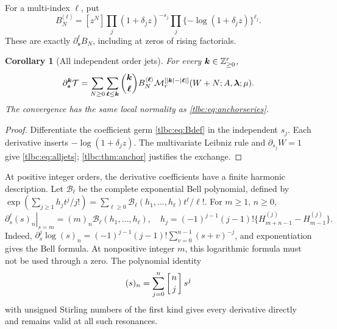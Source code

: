 \documentclass[11pt,letterpaper]{article}
\numberwithin{equation}{section}
\newtheorem{corollary}[theorem]{Corollary}
\theoremstyle{definition}\newtheorem{definition}[theorem]{Definition}
\theoremstyle{remark}\newtheorem{remark}[theorem]{Remark}
\newcommand{\M}{\mathcal M}\newcommand{\T}{\mathcal T}\newcommand{\K}{\mathcal K}
\newcommand{\bs}{\boldsymbol s}\newcommand{\ba}{\boldsymbol a}\newcommand{\bl}{\boldsymbol\lambda}
\begin{document}
For a multi-index $\boldsymbol\ell$, put
\begin{equation}\label{tlbc:eq:Bjet}
 B_N^{\langle\boldsymbol\ell\rangle}
 =[z^N]\prod_j(1+\delta_jz)^{-s_j}
              \prod_j\{-\log(1+\delta_jz)\}^{\ell_j}.
\end{equation}
These are exactly $\partial_{\bs}^{\boldsymbol\ell}B_N$, including at zeros of rising factorials.

\begin{corollary}[All independent order jets]\label{tlbc:cor:independentjets}
For every $\boldsymbol k\in\mathbb Z_{\ge0}^r$,
\begin{equation}\label{tlbc:eq:alljets}
 \partial_{\bs}^{\bk}\T
 =\sum_{N\ge0}\sum_{\boldsymbol\ell\le\bk}
       \binom{\bk}{\boldsymbol\ell}
       B_N^{\langle\boldsymbol\ell\rangle}
       \M_r^{[|\bk|-|\boldsymbol\ell|]}(W+N;A,\bl;\mu).
\end{equation}
The convergence has the same local normality as \eqref{tlbc:eq:anchorseries}.
\end{corollary}
\begin{proof}
Differentiate the coefficient germ \eqref{tlbc:eq:Bdef} in the independent $s_j$. Each derivative inserts $-\log(1+\delta_jz)$. The multivariate Leibniz rule and $\partial_{s_j}W=1$ give \eqref{tlbc:eq:alljets}; \cref{tlbc:thm:anchor} justifies the exchange.
\end{proof}

At positive integer orders, the derivative coefficients have a finite harmonic description. Let $\mathcal B_\ell$ be the complete exponential Bell polynomial, defined by
$\exp(\sum_{j\ge1}h_jt^j/j!)=\sum_{\ell\ge0}\mathcal B_\ell(h_1,\ldots,h_\ell)t^\ell/\ell!$.
For $m\ge1$, $n\ge0$,
\begin{equation}\label{tlbc:eq:Bellharmonic}
 \left.\partial_s^\ell(s)_n\right|_{s=m}
 =(m)_n\mathcal B_\ell(h_1,\ldots,h_\ell),\quad
 h_j=(-1)^{j-1}(j-1)!
       \{H_{m+n-1}^{(j)}-H_{m-1}^{(j)}\}.
\end{equation}
Indeed, $\partial_s^j\log(s)_n=(-1)^{j-1}(j-1)!\sum_{v=0}^{n-1}(s+v)^{-j}$, and exponentiation gives the Bell formula. At nonpositive integer $m$, this logarithmic formula must not be used through a zero. The polynomial identity
\begin{equation}\label{tlbc:eq:Stirling}
 (s)_n=\sum_{j=0}^n\left[{n\atop j}\right]s^j
\end{equation}
with unsigned Stirling numbers of the first kind gives every derivative directly and remains valid at all such resonances.
\end{document}
